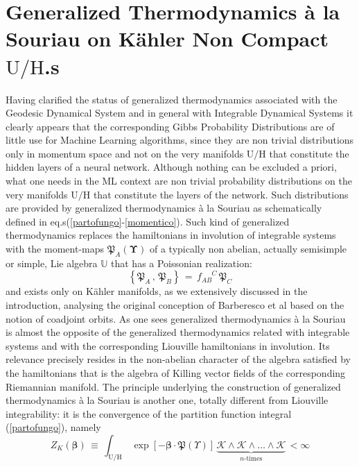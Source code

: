 \documentclass[10pt,a4paper]{article}
\begin{document}
 \section{Generalized Thermodynamics {\`a} la Souriau on K\"ahler Non Compact $\mathrm{U/H}$.s}
 \label{kellomastero}
 Having clarified the status of generalized thermodynamics associated with the Geodesic Dynamical System and in general with Integrable Dynamical Systems it clearly appears  that the corresponding Gibbs Probability Distributions are of little use for Machine Learning algorithms, since they are non trivial distributions only in momentum space and not on the very manifolds $\mathrm{U/H}$ that constitute the hidden layers of a neural network. Although nothing can be excluded a priori, what one needs in the ML context are  non trivial probability distributions on the very manifolds $\mathrm{U/H}$ that constitute the layers of the network. Such distributions are provided by
 generalized thermodynamics {\`a} la Souriau as schematically defined in eq.s(\ref{partofungo}-\ref{momentico}). Such kind of generalized thermodynamics replaces the hamiltonians in involution of integrable systems with the moment-maps $\mathfrak{P}_A(\boldsymbol{\Upsilon})$ of a typically non abelian, actually semisimple or simple, Lie algebra $\mathbb{U}$ that has a Poissonian realization:
\begin{equation}\label{larvadigatto}
  \left\{\mathfrak{P}_A\, , \, \mathfrak{P}_B \right\} \, = \, f_{AB}^{\phantom{AB}C} \, \mathfrak{P}_C
\end{equation}
and exists only on K\"ahler manifolds, as we extensively discussed in the introduction, analysing the original conception of Barberesco et al based on the notion of coadjoint orbits. As one sees generalized thermodynamics {\`a} la Souriau is almost the opposite of the generalized thermodynamics related with integrable systems and with the corresponding Liouville hamiltonians in involution. Its relevance precisely resides in the non-abelian character of the algebra satisfied by the hamiltonians that is the algebra of Killing vector fields of the corresponding Riemannian manifold.  The principle underlying the construction of generalized thermodynamics {\`a} la Souriau is another one, totally different from Liouville integrability: it is the convergence of the partition function integral (\ref{partofungo}), namely
\begin{equation}
  Z_K(\boldsymbol{\beta}) \, \equiv\, \int_{\mathrm{U/H}}\,  \exp\left[-\boldsymbol{\beta}\cdot \boldsymbol{\mathfrak{P}}(\Upsilon)\right]\,  \underbrace{\boldsymbol{\mathcal{K}}\wedge\boldsymbol{\mathcal{K}}\wedge
  \dots\wedge\boldsymbol{\mathcal{K}}}_{\text{$n$-times}} \, < \infty\label{convpartofungo}
\end{equation}
\end{document}
